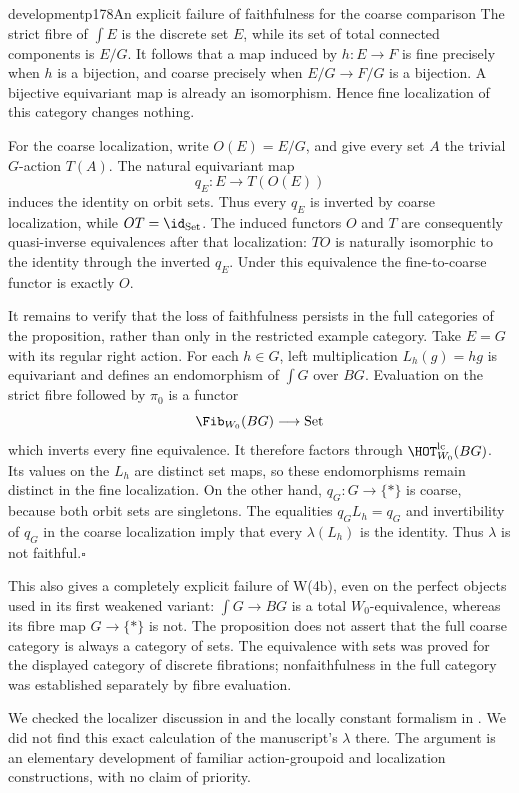 \begin{dcomment}{development}{p178}{An explicit failure of faithfulness for the coarse comparison}
The strict fibre of $\int E$ is the discrete set $E$, while its set of total connected components is $E/G$. It follows that a map induced by $h:E\to F$ is fine precisely when $h$ is a bijection, and coarse precisely when $E/G\to F/G$ is a bijection. A bijective equivariant map is already an isomorphism. Hence fine localization of this category changes nothing.

For the coarse localization, write $O(E)=E/G$, and give every set $A$ the trivial $G$-action $T(A)$. The natural equivariant map
\[
 q_E:E\longrightarrow T(O(E))
\]
induces the identity on orbit sets. Thus every $q_E$ is inverted by coarse localization, while $OT=\id_{\mathrm{Set}}$. The induced functors $O$ and $T$ are consequently quasi-inverse equivalences after that localization: $TO$ is naturally isomorphic to the identity through the inverted $q_E$. Under this equivalence the fine-to-coarse functor is exactly $O$.

It remains to verify that the loss of faithfulness persists in the full categories of the proposition, rather than only in the restricted example category. Take $E=G$ with its regular right action. For each $h\in G$, left multiplication $L_h(g)=hg$ is equivariant and defines an endomorphism of $\int G$ over $BG$. Evaluation on the strict fibre followed by $\pi_0$ is a functor
\[
 \Fib_{W_0}(BG)\longrightarrow\mathrm{Set}
\]
which inverts every fine equivalence. It therefore factors through $\HOT_{W_0}^{\mathrm{lc}}(BG)$. Its values on the $L_h$ are distinct set maps, so these endomorphisms remain distinct in the fine localization. On the other hand, $q_G:G\to\{*\}$ is coarse, because both orbit sets are singletons. The equalities $q_GL_h=q_G$ and invertibility of $q_G$ in the coarse localization imply that every $\lambda(L_h)$ is the identity. Thus $\lambda$ is not faithful.\hfill$\square$

This also gives a completely explicit failure of W(4b), even on the perfect objects used in its first weakened variant: $\int G\to BG$ is a total $W_0$-equivalence, whereas its fibre map $G\to\{*\}$ is not. The proposition does not assert that the full coarse category is always a category of sets. The equivalence with sets was proved for the displayed category of discrete fibrations; nonfaithfulness in the full category was established separately by fibre evaluation.

We checked the localizer discussion in \citep{Cisinski2004Minimal} and the locally constant formalism in \citep{Cisinski2009LocallyConstant}. We did not find this exact calculation of the manuscript's $\lambda$ there. The argument is an elementary development of familiar action-groupoid and localization constructions, with no claim of priority.
\end{dcomment}


